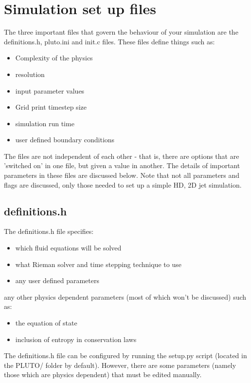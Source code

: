 \documentclass[12pt,a4paper]{report}
\begin{document}
\section{Simulation set up files}

The three important files that govern the behaviour of your simulation are the definitions.h, pluto.ini and init.c files. These files define things such as:
\begin{itemize}
	\item Complexity of the physics
	\item resolution
	\item input parameter values
	\item Grid print timestep size
	\item simulation run time
	\item user defined boundary conditions
\end{itemize}
 The files are not independent of each other - that is, there are options that are 'switched on' in one file, but given a value in another. The details of important parameters in these files are discussed below. Note that not all parameters and flags are discussed, only those needed to set up a simple HD, 2D jet simulation.

\subsection{definitions.h}
The definitions.h file specifies:
\begin{itemize}
	\item which fluid equations will be solved
	\item what Rieman solver and time stepping technique to use
	\item any user defined parameters
\end{itemize}
any other physics dependent parameters (most of which won't be discussed) such as:
\begin{itemize}
	\item the equation of state
	\item inclusion of entropy in conservation laws
\end{itemize}
 
The definitions.h file can be configured by running the setup.py script (located in the PLUTO/ folder by default). However, there are some parameters (namely those which are physics dependent) that must be edited manually.
\end{document}
